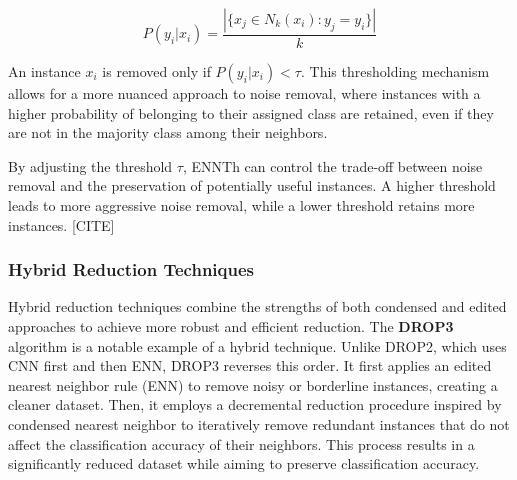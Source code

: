 \begin{equation}
P(y_i | x_i) = \frac{|\{x_j \in N_k(x_i) : y_j = y_i\}|}{k}
\end{equation}

An instance $x_i$ is removed only if $P(y_i | x_i) < \tau$. This thresholding mechanism allows for a more nuanced approach to noise removal, where instances with a higher probability of belonging to their assigned class are retained, even if they are not in the majority class among their neighbors.

By adjusting the threshold $\tau$, ENNTh can control the trade-off between noise removal and the preservation of potentially useful instances. A higher threshold leads to more aggressive noise removal, while a lower threshold retains more instances. [CITE]



\subsubsection*{Hybrid Reduction Techniques}

Hybrid reduction techniques combine the strengths of both condensed and edited approaches to 
achieve more robust and efficient reduction. The \textbf{DROP3} algorithm \cite{wilson2000reduction} 
is a notable example of a hybrid technique. Unlike DROP2, which uses CNN first and then ENN, DROP3 reverses this order. 
It first applies an edited nearest neighbor rule (ENN) to remove noisy or borderline instances, creating a cleaner dataset.
Then, it employs a decremental reduction procedure inspired by condensed nearest neighbor to iteratively remove redundant
instances that do not affect the classification accuracy of their neighbors. This process results in a significantly 
reduced dataset while aiming to preserve classification accuracy.

